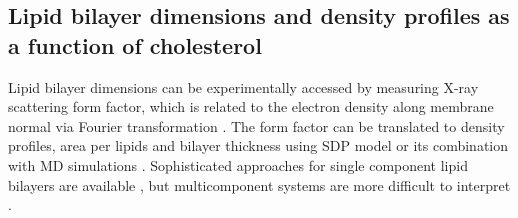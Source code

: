 \documentclass[aps,prl,superscriptaddress,twocolumn]{revtex4}
\begin{document}

\subsection{Lipid bilayer dimensions and density profiles as a function of cholesterol}

Lipid bilayer dimensions can be experimentally accessed by measuring X-ray scattering
form factor, which is related to the electron density along membrane normal
via Fourier transformation \cite{pan12,Heftberger15,Marquardt15,ollila16,??}.
The form factor can be translated to density profiles, 
area per lipids and bilayer thickness using SDP model or its combination with MD simulations  \cite{pan12,Heftberger15,Marquardt15,??}.
Sophisticated approaches for single component lipid bilayers are available \cite{??},
but multicomponent systems are more difficult to interpret \cite{pan12,Heftberger15,Marquardt15,??}.
\end{document}
